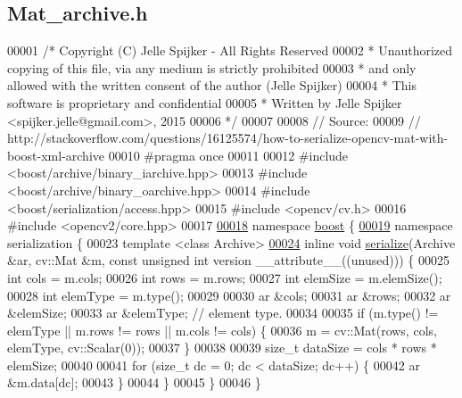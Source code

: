 \hypertarget{_mat__archive_8h_source}{}\subsection{Mat\+\_\+archive.\+h}
\label{_mat__archive_8h_source}

\begin{DoxyCode}
00001 \textcolor{comment}{/* Copyright (C) Jelle Spijker - All Rights Reserved}
00002 \textcolor{comment}{ * Unauthorized copying of this file, via any medium is strictly prohibited}
00003 \textcolor{comment}{ * and only allowed with the written consent of the author (Jelle Spijker)}
00004 \textcolor{comment}{ * This software is proprietary and confidential}
00005 \textcolor{comment}{ * Written by Jelle Spijker <spijker.jelle@gmail.com>, 2015}
00006 \textcolor{comment}{ */}
00007 
00008 \textcolor{comment}{// Source:}
00009 \textcolor{comment}{// http://stackoverflow.com/questions/16125574/how-to-serialize-opencv-mat-with-boost-xml-archive}
00010 \textcolor{preprocessor}{#pragma once}
00011 
00012 \textcolor{preprocessor}{#include <boost/archive/binary\_iarchive.hpp>}
00013 \textcolor{preprocessor}{#include <boost/archive/binary\_oarchive.hpp>}
00014 \textcolor{preprocessor}{#include <boost/serialization/access.hpp>}
00015 \textcolor{preprocessor}{#include <opencv/cv.h>}
00016 \textcolor{preprocessor}{#include <opencv2/core.hpp>}
00017 
\hypertarget{_mat__archive_8h_source_l00018}{}\hyperlink{namespaceboost}{00018} \textcolor{keyword}{namespace }\hyperlink{namespaceboost}{boost} \{
\hypertarget{_mat__archive_8h_source_l00019}{}\hyperlink{namespaceboost_1_1serialization}{00019} \textcolor{keyword}{namespace }serialization \{
00023 \textcolor{keyword}{template} <\textcolor{keyword}{class} Archive>
\hypertarget{_mat__archive_8h_source_l00024}{}\hyperlink{namespaceboost_1_1serialization_acf3ecd0fdaa3726a2332e266a4ecfe47}{00024} \textcolor{keyword}{inline} \textcolor{keywordtype}{void} \hyperlink{namespaceboost_1_1serialization_acf3ecd0fdaa3726a2332e266a4ecfe47}{serialize}(Archive &ar, cv::Mat &m, \textcolor{keyword}{const} \textcolor{keywordtype}{unsigned} \textcolor{keywordtype}{int} version \_\_attribute\_\_((unused)))
       \{
00025   \textcolor{keywordtype}{int} cols = m.cols;
00026   \textcolor{keywordtype}{int} rows = m.rows;
00027   \textcolor{keywordtype}{int} elemSize = m.elemSize();
00028   \textcolor{keywordtype}{int} elemType = m.type();
00029 
00030   ar &cols;
00031   ar &rows;
00032   ar &elemSize;
00033   ar &elemType; \textcolor{comment}{// element type.}
00034 
00035   \textcolor{keywordflow}{if} (m.type() != elemType || m.rows != rows || m.cols != cols) \{
00036     m = cv::Mat(rows, cols, elemType, cv::Scalar(0));
00037   \}
00038 
00039   \textcolor{keywordtype}{size\_t} dataSize = cols * rows * elemSize;
00040 
00041   \textcolor{keywordflow}{for} (\textcolor{keywordtype}{size\_t} dc = 0; dc < dataSize; dc++) \{
00042     ar &m.data[dc];
00043   \}
00044 \}
00045 \}
00046 \}
\end{DoxyCode}
